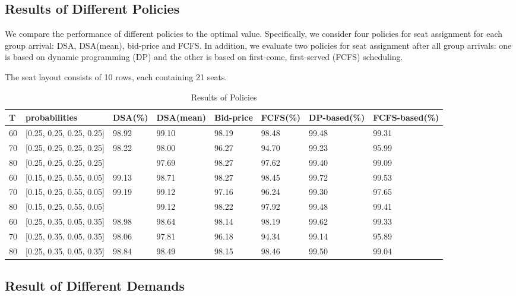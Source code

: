 \subsection{Results of Different Policies}

We compare the performance of different policies to the optimal value. Specifically, we consider four policies for seat assignment for each group arrival: DSA, DSA(mean), bid-price and FCFS. In addition, we evaluate two policies for seat assignment after all group arrivals: one is based on dynamic programming (DP) and the other is based on first-come, first-served (FCFS) scheduling.

The seat layout consists of 10 rows, each containing 21 seats.

\begin{table}[ht]
  \centering
  \caption{Results of Policies}
  \begin{tabular}{|l|l|l|l|l|l|l|l|}
  \hline
   T & probabilities &  DSA(\%) & DSA(mean) & Bid-price & FCFS(\%) & DP-based(\%) & FCFS-based(\%) \\
  \hline
   60  & [0.25, 0.25, 0.25, 0.25]  & 98.92 & 99.10 & 98.19 & 98.48 & 99.48 & 99.31 \\
   70  & [0.25, 0.25, 0.25, 0.25]  & 98.22 & 98.00 & 96.27 & 94.70 & 99.23 & 95.99 \\
   80  & [0.25, 0.25, 0.25, 0.25]  &       & 97.69 & 98.27 & 97.62 & 99.40 & 99.09 \\
   60  & [0.15, 0.25, 0.55, 0.05]  & 99.13 & 98.71 & 98.27 & 98.45 & 99.72 & 99.53 \\
   70  & [0.15, 0.25, 0.55, 0.05]  & 99.19 & 99.12 & 97.16 & 96.24 & 99.30 & 97.65 \\
   80  & [0.15, 0.25, 0.55, 0.05]  &       & 99.12 & 98.22 & 97.92 & 99.48 & 99.41 \\
   60  & [0.25, 0.35, 0.05, 0.35]  & 98.98 & 98.64 & 98.14 & 98.19 & 99.62 & 99.33 \\ 
   70  & [0.25, 0.35, 0.05, 0.35]  & 98.06 & 97.81 & 96.18 & 94.34 & 99.14 & 95.89 \\
   80  & [0.25, 0.35, 0.05, 0.35]  & 98.84 & 98.49 & 98.15 & 98.46 & 99.50 & 99.04 \\
  \hline
  \end{tabular}
\end{table}


\subsection{Result of Different Demands}

